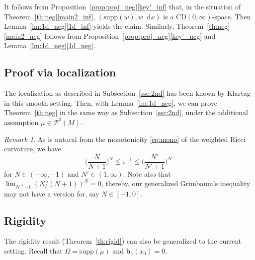 \documentclass[sts]{imsart}
\theoremstyle{definition}
\theoremstyle{remark}
\newtheorem{remark}[theorem]{Remark}
\newcommand{\bb}{\mathbf{b}}
\newcommand{\e}{\mathrm{e}}
\newcommand{\CD}{\mathrm{CD}}
\newcommand{\supp}{\mathrm{supp}}
\newcommand*\diff{\mathop{}\!\mathrm{d}}
\begin{document}
It follows from Proposition~\ref{prop:proj_neg}\eqref{key'_inf} that, in the situation of Theorem~\ref{th:neg}\eqref{main2_inf}, $(\supp(w),w \diff x)$ is a $\CD(0,\infty)$-space.
Then Lemma~\ref{lm:1d_neg}\eqref{1d_inf} yields the claim.
Similarly, Theorem~\ref{th:neg}\eqref{main2_neg} follows from Proposition~\ref{prop:proj_neg}\eqref{key'_neg} and Lemma~\ref{lm:1d_neg}\eqref{1d_neg}.

\subsection{Proof via localization}\label{ssc:proof2_neg}%

The localization as described in Subsection~\ref{ssc:2nd} has been known by Klartag \cite[Theorem~1.2]{Kl} in this smooth setting.
Then, with Lemma~\ref{lm:1d_neg}, we can prove Theorem~\ref{th:neg} in the same way as Subsection~\ref{ssc:2nd}, under the additional assumption $\mu \in \mathcal{P}^2(M)$.

\begin{remark}\label{rm:N}
As is natural from the monotonicity \eqref{eq:mono} of the weighted Ricci curvature, we have
\[ \biggl( \frac{N}{N+1} \biggr)^N \le \e^{-1} \le \biggl( \frac{N'}{N'+1} \biggr)^{N'} \]
for $N \in (-\infty,-1)$ and $N' \in (1,\infty)$.
Note also that $\lim_{N \uparrow -1} (N/(N+1))^N =0$, thereby, our generalized Gr\"unbaum's inequality may not have a version for, say $N \in [-1,0]$.
\end{remark}

\subsection{Rigidity}\label{ssc:rigid_neg}%

The rigidity result (Theorem~\ref{th:rigid}) can also be generalized to the current setting.
Recall that $\Omega=\supp(\mu)$ and $\bb_\gamma(x_0)=0$.
\end{document}
